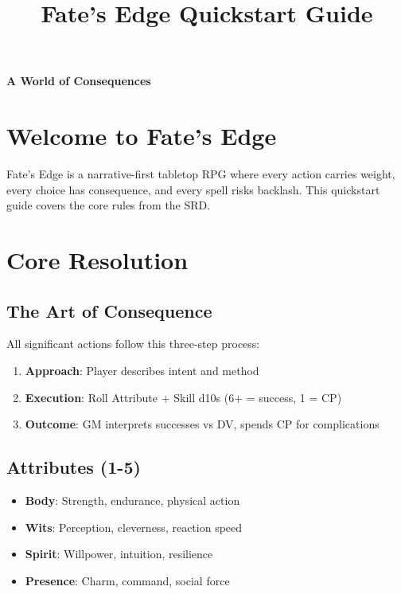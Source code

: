 \documentclass[11pt]{article}
\title{Fate's Edge Quickstart Guide}
\author{}
\date{}
\begin{document}
\maketitle

\begin{center}
\textbf{A World of Consequences}
\end{center}

\section{Welcome to Fate's Edge}

Fate's Edge is a narrative-first tabletop RPG where every action carries weight, every choice has consequence, and every spell risks backlash. This quickstart guide covers the core rules from the SRD.

\section{Core Resolution}

\subsection{The Art of Consequence}
All significant actions follow this three-step process:
\begin{enumerate}
    \item \textbf{Approach}: Player describes intent and method
    \item \textbf{Execution}: Roll Attribute + Skill d10s (6+ = success, 1 = CP)
    \item \textbf{Outcome}: GM interprets successes vs DV, spends CP for complications
\end{enumerate}

\subsection{Attributes (1-5)}
\begin{itemize}
    \item \textbf{Body}: Strength, endurance, physical action
    \item \textbf{Wits}: Perception, cleverness, reaction speed  
    \item \textbf{Spirit}: Willpower, intuition, resilience
    \item \textbf{Presence}: Charm, command, social force
\end{itemize}
\end{document}

